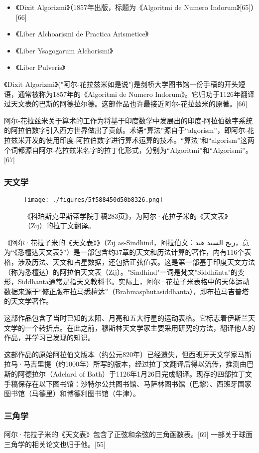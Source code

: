 \begin{itemize}
\item 《Dixit Algorizmi》（1857年出版，标题为《Algoritmi de Numero Indorum》[65]）[66]
\item 《Liber Alchoarismi de Practica Arismetice》
\item 《Liber Ysagogarum Alchorismi》
\item 《Liber Pulveris》
\end{itemize}

《Dixit Algorizmi》("阿尔-花拉兹米如是说")是剑桥大学图书馆一份手稿的开头短语，通常被称为1857年的《Algoritmi de Numero Indorum》。它归功于1126年翻译过天文表的巴斯的阿德拉尔德。这部作品也许最接近阿尔-花拉兹米的原著。[66]

阿尔-花拉兹米关于算术的工作为将基于印度数学中发展出的印度-阿拉伯数字系统的阿拉伯数字引入西方世界做出了贡献。术语“算法”源自于“algorism”，即阿尔-花拉兹米开发的使用印度-阿拉伯数字进行算术运算的技术。“算法”和“algorism”这两个词都源自阿尔-花拉兹米名字的拉丁化形式，分别为“Algoritmi”和“Algorismi”。[67]
\subsubsection{天文学}
\begin{figure}[ht]
\centering
\texttt{[image: ./figures/5f588450d50b8326.png]}
\caption{《科珀斯克里斯蒂学院手稿283页》，为阿尔·花拉子米的《天文表》（Zīj）的拉丁文翻译。} \label{fig_HLZM_8}
\end{figure}
《阿尔·花拉子米的《天文表》》（Zīj as-Sindhind，阿拉伯文：زيج السند هند，意为“《悉檀达天文表》”）是一部包含约37章的天文和历法计算的著作，内有116个表格，涉及历法、天文和占星数据，还包括正弦值表。这是第一部基于印度天文方法（称为悉檀达）的阿拉伯天文表（Zij）。"Sindhind"一词是梵文"Siddhānta"的变形，Siddhānta通常是指天文教科书。实际上，阿尔·花拉子米表格中的天体运动数据来源于“修正版布拉马悉檀达”（Brahmasphutasiddhanta），即布拉马吉普塔的天文学著作。

这部作品包含了当时已知的太阳、月亮和五大行星的运动表格。它标志着伊斯兰天文学的一个转折点。在此之前，穆斯林天文学家主要采用研究的方法，翻译他人的作品，并学习已发现的知识。

这部作品的原始阿拉伯文版本（约公元820年）已经遗失，但西班牙天文学家马斯拉马·马吉里提（约1000年）所写的版本，经过拉丁文翻译后得以流传，推测由巴斯的阿德拉尔（Adelard of Bath）于1126年1月26日完成翻译。现存的四部拉丁文手稿保存在以下图书馆：沙特尔公共图书馆、马萨林图书馆（巴黎）、西班牙国家图书馆（马德里）和博德利图书馆（牛津）。
\subsubsection{三角学}  
阿尔·花拉子米的《天文表》包含了正弦和余弦的三角函数表。[69] 一部关于球面三角学的相关论文也归于他。[55]

